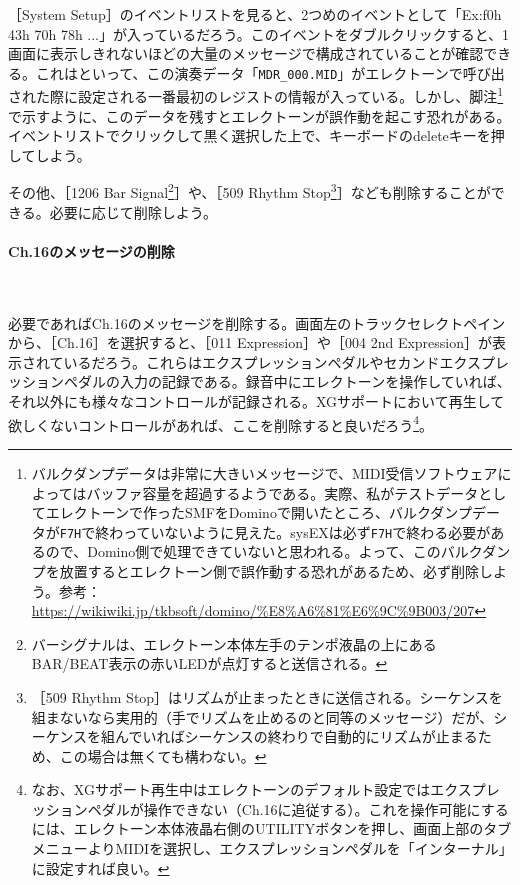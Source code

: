 \documentclass[uplatex, 10pt, dvipdfmx]{jsarticle}
\numberwithin{equation}{section}
\newcommand{\emphj}[1]{\textbf{\textrm{\textgt{{#1}}}}}
\begin{document}
［System Setup］のイベントリストを見ると、2つめのイベントとして「Ex:f0h 43h 70h 78h ...」が入っているだろう。このイベントをダブルクリックすると、1画面に表示しきれないほどの大量のメッセージで構成されていることが確認できる。これは\emphj{バルクダンプ}といって、この演奏データ「\texttt{MDR_000.MID}」がエレクトーンで呼び出された際に設定される一番最初のレジストの情報が入っている。しかし、脚注\footnote{バルクダンプデータは非常に大きいメッセージで、MIDI受信ソフトウェアによってはバッファ容量を超過するようである。実際、私がテストデータとしてエレクトーンで作ったSMFをDominoで開いたところ、バルクダンプデータが\texttt{F7H}で終わっていないように見えた。sysEXは必ず\texttt{F7H}で終わる必要があるので、Domino側で処理できていないと思われる。よって、このバルクダンプを放置するとエレクトーン側で誤作動する恐れがあるため、必ず削除しよう。参考：\url{https://wikiwiki.jp/tkbsoft/domino/%E8%A6%81%E6%9C%9B003/207}}で示すように、このデータを残すとエレクトーンが誤作動を起こす恐れがある。イベントリストでクリックして黒く選択した上で、キーボードのdeleteキーを押して\emphj{必ず削除}しよう。

その他、［1206 Bar Signal\footnote{バーシグナルは、エレクトーン本体左手のテンポ液晶の上にあるBAR/BEAT表示の赤いLEDが点灯すると送信される。}］や、［509 Rhythm Stop\footnote{［509 Rhythm Stop］はリズムが止まったときに送信される。シーケンスを組まないなら実用的（手でリズムを止めるのと同等のメッセージ）だが、シーケンスを組んでいればシーケンスの終わりで自動的にリズムが止まるため、この場合は無くても構わない。}］なども削除することができる。必要に応じて削除しよう。

\paragraph{Ch.16のメッセージの削除} \ 

必要であればCh.16のメッセージを削除する。画面左のトラックセレクトペインから、［Ch.16］を選択すると、［011 Expression］や［004 2nd Expression］が表示されているだろう。これらはエクスプレッションペダルやセカンドエクスプレッションペダルの入力の記録である。録音中にエレクトーンを操作していれば、それ以外にも様々なコントロールが記録される。XGサポートにおいて再生して欲しくないコントロールがあれば、ここを削除すると良いだろう\footnote{なお、XGサポート再生中はエレクトーンのデフォルト設定ではエクスプレッションペダルが操作できない（Ch.16に追従する）。これを操作可能にするには、エレクトーン本体液晶右側のUTILITYボタンを押し、画面上部のタブメニューよりMIDIを選択し、エクスプレッションペダルを「インターナル」に設定すれば良い。}。
\end{document}
